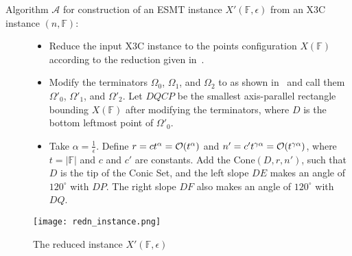 \begin{description}
\item [Algorithm $\mathcal{A}$ for construction of an ESMT instance $X'(\mathbb{F},\epsilon)$ from an X3C instance $(n,\mathbb{F})$:]
\hspace{0.1cm}
\begin{itemize}
    \item Reduce the input X3C instance to the points configuration $X(\mathbb{F})$ according to the reduction given in~\cite{garey1977complexity}.
    \item Modify the terminators $\Omega_0$, $\Omega_1$, and $\Omega_2$ to as shown in~ and call them $\Omega'_0$, $\Omega'_1$, and $\Omega'_2$. Let $DQCP$ be the smallest axis-parallel rectangle bounding $X(\mathbb{F})$ after modifying the terminators, where $D$ is the bottom leftmost point of $\Omega'_0$.
    \item Take $\alpha = \frac{1}{\epsilon}$. Define $r = ct^{\alpha} = \mathcal{O}(t^{\alpha})$ and $n' = c't^{\gamma\alpha} = \mathcal{O}(t^{\gamma\alpha})$, where $t=|\mathbb{F}|$ and $c$ and $c'$ are constants. Add the $\mathrm{Cone}(D,r,n')$, such that $D$ is the tip of the Conic Set, and the left slope $DE$ makes an angle of $120^\circ$ with $DP$. The right slope $DF$ also makes an angle of $120^\circ$ with $DQ$.
\end{itemize}
\end{description}

\begin{figure}[h]
\centering
\texttt{[image: redn\_instance.png]}
\caption{The reduced instance $X'(\mathbb{F},\epsilon)$}
\label{fig:redn_instance}
\end{figure}

